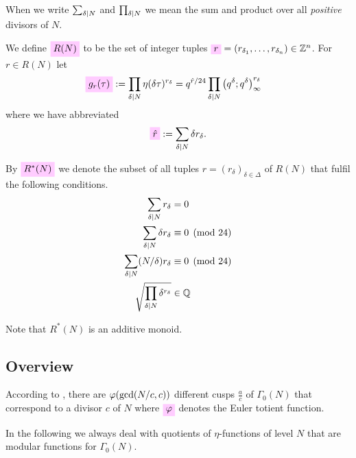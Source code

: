 \documentclass{article}
\begin{document}
When we write $\sum_{\delta \mid N}$ and $\prod_{\delta \mid N}$ we mean the sum
and product over all \emph{positive} divisors of $N$.

We define $\defineNotation[RN]{R(N)}$ to be the set of integer tuples
$\defineNotation[r]{r} = (r_{\delta_1}, \ldots,
r_{\delta_n})\in \setZ^n$.
%
For $r\in R(N)$ let
\begin{align}
  \defineNotation[g-r-tau]{g_r(\tau)}
  &:=
    \divisorprod{N} \eta(\delta\tau)^{r_\delta}
    =
    q^{{\sumdelta{r}}/{24}}
      \divisorprod{N} \eulerFunction{\delta}^{r_\delta}
  \label{eq:g_r(tau)}
\end{align}
where we have abbreviated
\begin{gather}
  \defineNotation[r^{}]{\sumdelta{r}} := \divisorsum{N} \delta r_\delta.
\end{gather}




By $\defineNotation[R*N]{R^*(N)}$ we denote the subset of all tuples
$r=(r_\delta)_{\delta\in\Delta}$ of $R(N)$ that fulfil the following
conditions.
\begin{align}
 \sum_{\delta \mid N} r_\delta &= 0\label{eq:sum=0}\\
 \sum_{\delta \mid N} \delta r_\delta &\equiv 0\pmod{24}\label{eq:sigmainfinity}\\
 \sum_{\delta \mid N} (N/\delta)r_\delta &\equiv 0\pmod{24}\label{eq:sigma0}\\
 \sqrt{\prod_{\delta \mid N}\delta^{r_\delta}} &\in \mathbb{Q}\label{eq:productsquare}
\end{align}

Note that $R^*(N)$ is an additive monoid.

\subsection{Overview}

According to
\cite[Lemma~5.3]{Radu:AlgebraicRelationsInvolvingEtaQuotients:2016},
there are $\varphi(\gcd(N/c, c))$ different cusps $\frac{a}{c}$ of
$\Gamma_0(N)$ that correspond to a divisor $c$ of $N$ where
$\defineNotation[phi]{\eulerphi}$ denotes the Euler totient function.

In the following we always deal with quotients of $\eta$-functions of
level $N$ that are modular functions for $\Gamma_0(N)$.
\end{document}
